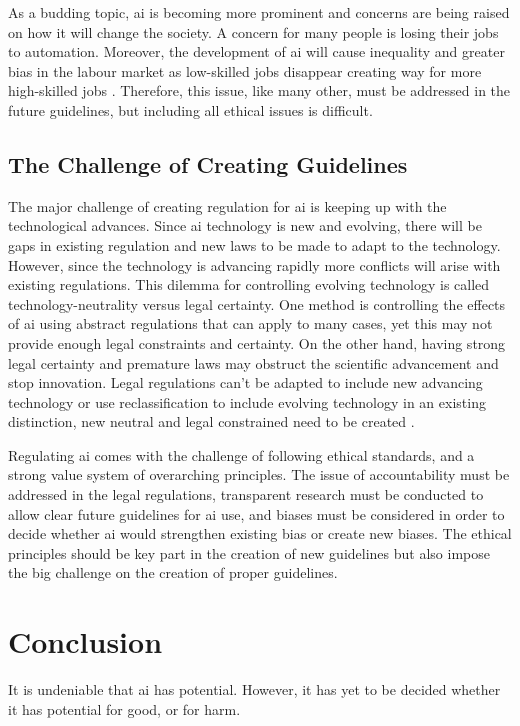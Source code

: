 \documentclass[11pt]{article}
\begin{document}
As a budding topic, \gls{ai} is becoming more prominent and concerns are being raised on how it will change the society.
A concern for many people is losing their jobs to automation. 
Moreover, the development of \gls{ai} will cause inequality and greater bias in the labour market as low-skilled jobs disappear creating way for more high-skilled jobs \citep{leenes2017}.
Therefore, this issue, like many other, must be addressed in the future guidelines, but including all ethical issues is difficult.

\subsection{The Challenge of Creating Guidelines}
\label{sec:orgb872086}
The major challenge of creating regulation for \gls{ai} is keeping up with the technological advances. 
Since \gls{ai} technology is new and evolving, there will be gaps in existing regulation and new laws to be made to adapt to the technology. 
However, since the technology is advancing rapidly more conflicts will arise with existing regulations. 
This dilemma for controlling evolving technology is called technology-neutrality versus legal certainty. 
One method is controlling the effects of \gls{ai} using abstract regulations that can apply to many cases, yet this may not provide enough legal constraints and certainty. 
On the other hand, having strong legal certainty and premature laws may obstruct the scientific advancement and stop innovation. 
Legal regulations can’t be adapted to include new advancing technology or use reclassification to include evolving technology in an existing distinction, new neutral and legal constrained need to be created \citep{leenes2017}. 

Regulating \gls{ai} comes with the challenge of following ethical standards, and a strong value system of overarching principles. 
The issue of accountability must be addressed in the legal regulations, transparent research must be conducted to allow clear future guidelines for \gls{ai} use, and biases must be considered in order to decide whether \gls{ai} would strengthen existing bias or create new biases. 
The ethical principles should be key part in the creation of new guidelines but also impose the big challenge on the creation of proper guidelines. 

\section{Conclusion}
\label{sec:orgc4fccb6}
It is undeniable that \gls{ai} has potential. 
However, it has yet to be decided whether it has potential for good, or for harm. 
\end{document}
